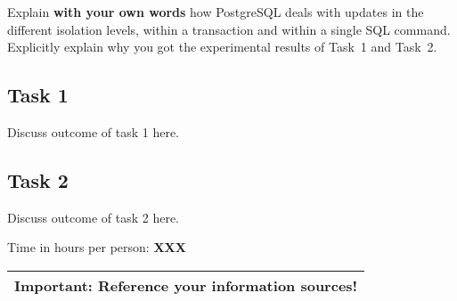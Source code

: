 \documentclass[11pt]{scrartcl}
\begin{document}
Explain {\bf with your own words} how PostgreSQL deals with updates in
the different isolation levels, within a transaction and within a
single SQL command. Explicitly explain why you got the experimental
results of Task~1 and Task~2.

\subsection*{Task 1}

Discuss outcome of task 1 here.

\subsection*{Task 2}

Discuss outcome of task 2 here.

\bigskip

\noindent Time in hours per person: {\bf XXX}

\bigskip

\begin{center}
  \begin{tabular}{c}
    \hline
    {\bf Important:} Reference your information sources!
    \\\hline
  \end{tabular}
\end{center}
\end{document}
